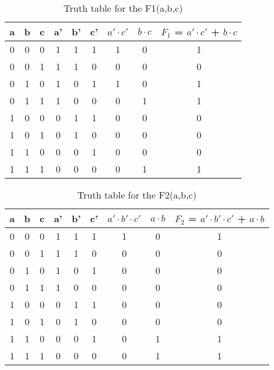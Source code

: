 \begin{table}[h]
\centering
\begin{tabular}{|c|c|c|c|c|c|c|c|c|}
\hline
a & b & c & a' & b' & c' & $a' \cdot c'$ & $b \cdot c$ & $F_{1}$ = $a' \cdot c'$ + $b \cdot c$     \\ \hline
0 & 0 & 0 & 1  & 1  & 1  & 1             & 0      & 1             \\ \hline
0 & 0 & 1 & 1  & 1  & 0  & 0             & 0      & 0               \\ \hline
0 & 1 & 0 & 1  & 0  & 1  & 1             & 0      & 1              \\ \hline
0 & 1 & 1 & 1  & 0  & 0  & 0             & 1      & 1               \\ \hline
1 & 0 & 0 & 0  & 1  & 1  & 0             & 0      & 0               \\ \hline
1 & 0 & 1 & 0  & 1  & 0  & 0             & 0      & 0           \\ \hline
1 & 1 & 0 & 0  & 0  & 1  & 0             & 0      & 0          \\ \hline
1 & 1 & 1 & 0  & 0  & 0  & 0             & 1      & 1               \\ \hline
\end{tabular}
\caption{Truth table for the F1(a,b,c)}
\label{part4-a1-truth-table}
\end{table}






\begin{table}[!h]
\centering
\begin{tabular}{|c|c|c|c|c|c|c|c|c|}
\hline
a & b & c & a' & b' & c' & $a' \cdot b' \cdot c'$ & $a \cdot b$ & $F_{2}$ = $a' \cdot b' \cdot c'$ + $a \cdot b$      \\ \hline
0 & 0 & 0 & 1  & 1  & 1  & 1             & 0      & 1             \\ \hline
0 & 0 & 1 & 1  & 1  & 0  & 0             & 0      & 0               \\ \hline
0 & 1 & 0 & 1  & 0  & 1  & 0             & 0      & 0              \\ \hline
0 & 1 & 1 & 1  & 0  & 0  & 0             & 0      & 0               \\ \hline
1 & 0 & 0 & 0  & 1  & 1  & 0             & 0      & 0               \\ \hline
1 & 0 & 1 & 0  & 1  & 0  & 0             & 0      & 0           \\ \hline
1 & 1 & 0 & 0  & 0  & 1  & 0             & 1      & 1          \\ \hline
1 & 1 & 1 & 0  & 0  & 0  & 0             & 1      & 1               \\ \hline
\end{tabular}
\caption{Truth table for the F2(a,b,c)}
\label{part4-a2-truth-table}
\end{table}
